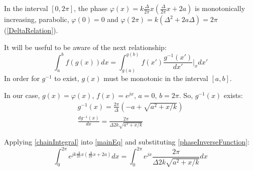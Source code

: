 In the interval $[0, 2\pi]$, the phase $\varphi(x) = k \frac{\Delta}{2\pi}x (\frac{\Delta}{2\pi}x + 2a)$ is monotonically increasing, parabolic, $\varphi(0) = 0$ and $\varphi(2\pi) = k(\Delta^2 + 2a\Delta) = 2\pi$ (\autoref{DeltaRelation}).

It will be useful to be aware of the next relationship:
\begin{equation}
\int_a^b f(g(x)) dx = \int_{g(a)}^{g(b)} f(x') \frac{g^{-1}(x')}{dx'}\Big\vert_x dx'
\label{chainIntegral}
\end{equation}
In order for $g^{-1}$ to exist, $g(x)$ must be monotonic in the interval $[a, b]$.

In our case, $g(x) = \varphi(x)$, $f(x) = e^{jx}$, $a = 0$, $b = 2\pi$. So, $g^{-1}(x)$ exists:
\begin{gather}
g^{-1}(x) = \frac{2\pi}{\Delta} \left(-a + \sqrt{a^2 + x/k}\right) \\
\frac{d g^{-1}(x)}{dx} = \frac{2\pi}{\Delta 2 k \sqrt{a^2 + x/k}}
\label{phaseInverseFunction}
\end{gather}

Applying \autoref{chainIntegral} into \autoref{mainEq} and substituting \autoref{phaseInverseFunction}:
\begin{equation}
\int_{0}^{2\pi} e^{j k \frac{\Delta}{2\pi}x (\frac{\Delta}{2\pi}x + 2a)} dx = \int_{0}^{2\pi} e^{j x} \frac{2\pi}{\Delta 2 k \sqrt{a^2 + x/k}} dx
\end{equation}



